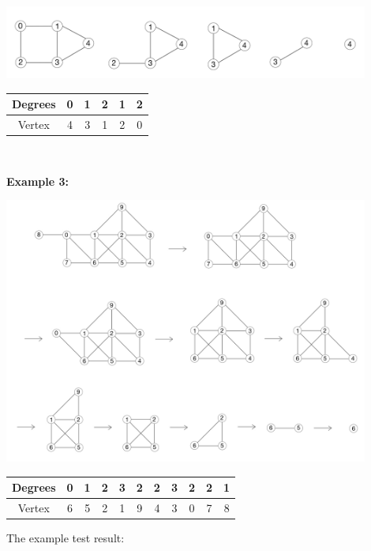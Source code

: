 \documentclass{article}
\begin{document}
\begin{enumerate}
\begin{center}
        \includegraphics[width=0.9\textwidth]{Ex2.jpeg}
                \begin{tabular}{|c|c|c|c|c|c|}
        \hline
            Degrees & 0&1& 2& 1&  2\\
            \hline
            Vertex & 4& 3& 1& 2&   0\\ 
            \hline
        \end{tabular}
        \\
   \end{center}     
     \textbf{   Example 3:}
     \begin{center}
    \includegraphics[width=0.9\textwidth]{Ex3.jpeg}
                    \begin{tabular}{|c|c|c|c|c|c|c|c|c|c|c|}
        \hline
            Degrees &0&1& 2&3&2& 2&3& 2& 2&  1\\
            \hline
            Vertex &6&5&2&1&9& 4& 3& 0& 7&   8\\ 
            \hline
        \end{tabular}
    \end{center} 
                The example test result:
            \begin{center}

\end{center}
\end{enumerate}
\end{document}
